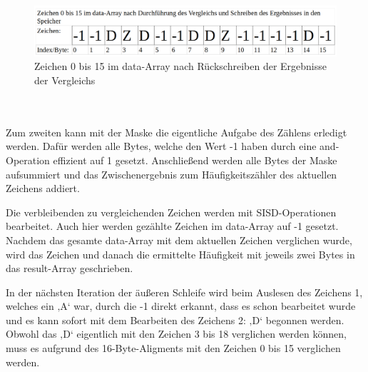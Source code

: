 \documentclass[course=erap]{aspdoc}
\begin{document}
\begin{figure}[h]
\begin{center}
\includegraphics[scale=0.2633]{resourcen/abb2.png}
\caption{Zeichen 0 bis 15 im data-Array nach Rückschreiben der Ergebnisse der Vergleichs}
\label{abb3}
\end{center}
\end{figure}
\\
\\Zum zweiten kann mit der Maske die eigentliche Aufgabe des Zählens erledigt werden. Dafür werden alle Bytes, welche den Wert -1 haben durch eine and-Operation effizient auf 1 gesetzt. Anschließend werden alle Bytes der Maske aufsummiert und das Zwischenergebnis zum Häufigkeitszähler des aktuellen Zeichens addiert.


Die verbleibenden zu vergleichenden Zeichen werden mit SISD-Operationen bearbeitet. Auch hier werden gezählte Zeichen im data-Array auf -1 gesetzt. Nachdem das gesamte data-Array mit dem aktuellen Zeichen verglichen wurde, wird das Zeichen und danach die ermittelte Häufigkeit mit jeweils zwei Bytes in das result-Array geschrieben.


In der nächsten Iteration der äußeren Schleife wird beim Auslesen des Zeichens 1, welches ein ‚A‘ war, durch die -1 direkt erkannt, dass es schon bearbeitet wurde und es kann sofort mit dem Bearbeiten des Zeichens 2: ‚D‘ begonnen werden. Obwohl das ‚D‘ eigentlich mit den Zeichen 3 bis 18  verglichen werden können, muss es aufgrund des 16-Byte-Aligments mit den Zeichen 0 bis 15 verglichen werden.
\end{document}
